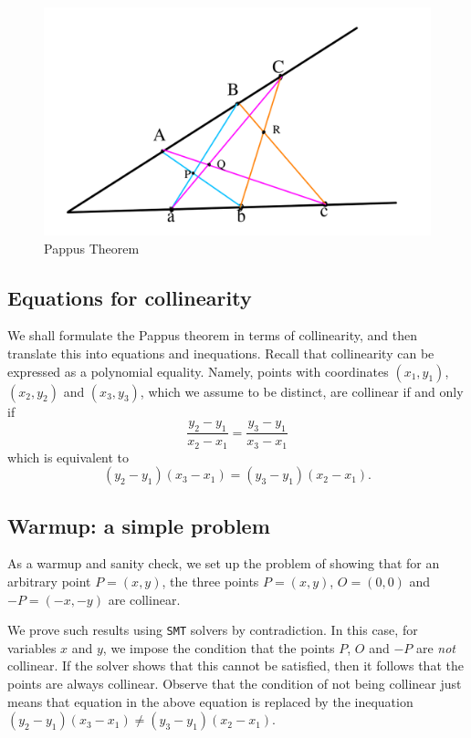 \documentclass{amsart}
\theoremstyle{plain}
\theoremstyle{definition}
\theoremstyle{remark}
\begin{document}
\begin{figure}
	\centering
	\includegraphics[scale=0.3]{Pappus.png}
	\caption{Pappus Theorem}\label{F:pappus}
\end{figure}

\hypertarget{equations-for-collinearity}{%
	\subsection{Equations for
		collinearity}\label{equations-for-collinearity}}

We shall formulate the Pappus theorem in terms of collinearity, and
then translate this into equations and inequations.
Recall that collinearity can be
expressed as a polynomial equality. Namely, points with coordinates
\((x_1, y_1)\), \((x_2, y_2)\) and \((x_3, y_3)\), which we assume to be
distinct, are collinear if and only if
\[\frac{y_2 - y_1}{x_2 - x_1} = \frac{y_3 - y_1}{x_3 - x_1}\] which is
equivalent to \[(y_2 - y_1)(x_3 - x_1) = (y_3 - y_1)(x_2 - x_1).\]

\subsection{Warmup: a simple problem}\label{a-simple-problem}

As a warmup and sanity check, we set up the problem of showing that for
an arbitrary point \(P = (x, y)\), the three points \(P=(x, y)\),
\(O=(0, 0)\) and \(-P=(-x, -y)\) are collinear.

We prove such results using \texttt{SMT} solvers by contradiction. In this case,
for variables \(x\) and \(y\), we impose the condition that the points
\(P\), \(O\) and \(-P\) are \emph{not} collinear. If the solver shows
that this cannot be satisfied, then it follows that the points are
always collinear. Observe that the condition of not being collinear just
means that equation in the above equation is replaced by the inequation
\((y_2 - y_1)(x_3 - x_1) \neq (y_3 - y_1)(x_2 - x_1)\).
\end{document}
